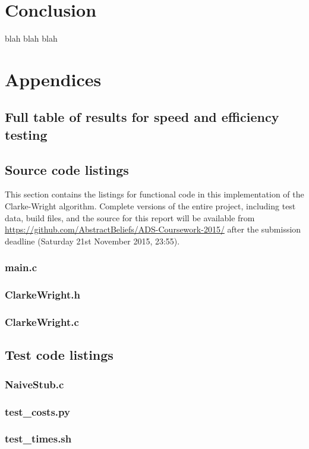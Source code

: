 \documentclass[a4paper]{article}
\begin{document}
    \section{Conclusion}
    blah blah blah

    
    
    
    \section{Appendices}
        \subsection{Full table of results for speed and efficiency testing}
        \subsection{Source code listings}
            This section contains the listings for functional code in this implementation of the Clarke-Wright algorithm.
            Complete versions of the entire project, including test data, build files, and the source for this report will be available from
            \url{https://github.com/AbstractBeliefs/ADS-Coursework-2015/} after the submission deadline (Saturday 21st November 2015, 23:55).
            \subsubsection{main.c}
                
            \subsubsection{ClarkeWright.h}
                
            \subsubsection{ClarkeWright.c}
                
        \subsection{Test code listings}
            \subsubsection{NaiveStub.c}
                
            \subsubsection{test\_costs.py}
                
            \subsubsection{test\_times.sh}
                
\end{document}
